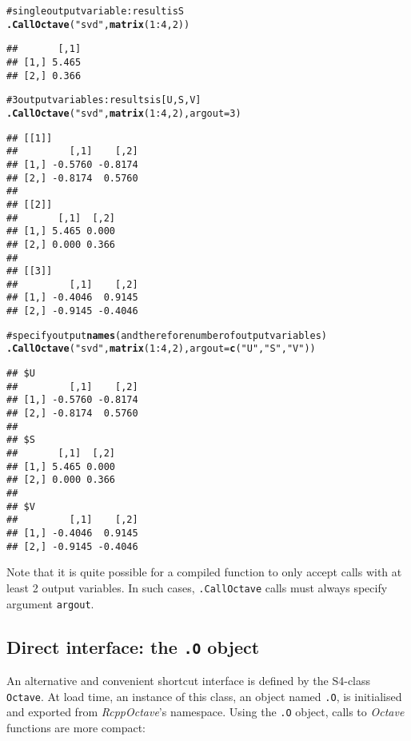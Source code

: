 \documentclass[english,10pt,a4paper]{article}\usepackage{graphicx, color}
\makeatletter
\newcommand{\hlfunctioncall}[1]{\textcolor[rgb]{0.501960784313725,0,0.329411764705882}{\textbf{#1}}}%
\newcommand{\hlstring}[1]{\textcolor[rgb]{0.6,0.6,1}{#1}}%
\newcommand{\hlcomment}[1]{\textcolor[rgb]{0.180392156862745,0.6,0.341176470588235}{#1}}%
\newenvironment{kframe}{%
 \def\at@end@of@kframe{}%
 \ifinner\ifhmode%
  \def\at@end@of@kframe{\end{minipage}}%
  \begin{minipage}{\columnwidth}%
 \fi\fi%
 \def\FrameCommand##1{\hskip\@totalleftmargin \hskip-\fboxsep
 \colorbox{shadecolor}{##1}\hskip-\fboxsep
     \hskip-\linewidth \hskip-\@totalleftmargin \hskip\columnwidth}%
 \MakeFramed {\advance\hsize-\width
   \@totalleftmargin\z@ \linewidth\hsize
   \@setminipage}}%
 {\par\unskip\endMakeFramed%
 \at@end@of@kframe}
\newenvironment{knitrout}{}{} %
\let\proglang=\textit
\let\code=\texttt
\newcommand{\pkgname}[1]{\textit{#1}\xspace}
\newcommand{\octave}{\proglang{Octave}\xspace}
\makeatother
\begin{document}
\begin{knitrout}
\color{fgcolor}\begin{kframe}
\begin{alltt}
\hlcomment{# single output variable: result is S}
\hlfunctioncall{.CallOctave}(\hlstring{"svd"}, \hlfunctioncall{matrix}(1:4, 2))
\end{alltt}
\begin{verbatim}
##       [,1]
## [1,] 5.465
## [2,] 0.366
\end{verbatim}
\begin{alltt}
\hlcomment{# 3 output variables: results is [U,S,V]}
\hlfunctioncall{.CallOctave}(\hlstring{"svd"}, \hlfunctioncall{matrix}(1:4, 2), argout = 3)
\end{alltt}
\begin{verbatim}
## [[1]]
##         [,1]    [,2]
## [1,] -0.5760 -0.8174
## [2,] -0.8174  0.5760
## 
## [[2]]
##       [,1]  [,2]
## [1,] 5.465 0.000
## [2,] 0.000 0.366
## 
## [[3]]
##         [,1]    [,2]
## [1,] -0.4046  0.9145
## [2,] -0.9145 -0.4046
\end{verbatim}
\begin{alltt}
\hlcomment{# specify output \hlfunctioncall{names} (and therefore number of output variables)}
\hlfunctioncall{.CallOctave}(\hlstring{"svd"}, \hlfunctioncall{matrix}(1:4, 2), argout = \hlfunctioncall{c}(\hlstring{"U"}, \hlstring{"S"}, \hlstring{"V"}))
\end{alltt}
\begin{verbatim}
## $U
##         [,1]    [,2]
## [1,] -0.5760 -0.8174
## [2,] -0.8174  0.5760
## 
## $S
##       [,1]  [,2]
## [1,] 5.465 0.000
## [2,] 0.000 0.366
## 
## $V
##         [,1]    [,2]
## [1,] -0.4046  0.9145
## [2,] -0.9145 -0.4046
\end{verbatim}
\end{kframe}
\end{knitrout}


Note that it is quite possible for a compiled function to only accept
calls with at least 2 output variables.
In such cases, \code{.CallOctave} calls must always specify argument
\code{argout}.

\subsection{Direct interface: the \texttt{.O} object}

An alternative and convenient shortcut interface is defined by the S4-class
\code{Octave}.
At load time, an instance of this class, an object named \code{.O}, is
initialised and exported from \pkgname{RcppOctave}'s namespace.
Using the \code{.O} object, calls to \octave functions are more compact: 
\end{document}
